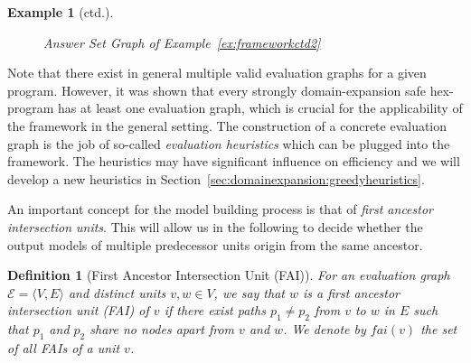 \documentclass[11pt,fleqn,twoside]{article}
\newcommand\hex{{\sc hex}\xspace}
\newtheorem{definition}{Definition}
\newtheorem{example}{Example}
\begin{document}
{\begin{example}[ctd.]
\begin{figure}[h]
					\endpgfgraphicnamed
					
					\caption{Answer Set Graph of Example~\ref{ex:frameworkctd2}}
					\label{fig:ex:frameworkctd:modelgraph}
				\end{figure}
			\end{example}
			
			Note that there exist in general multiple valid evaluation graphs for a given program.
			However, it was shown that every strongly domain-expansion safe \hex-program
			has at least one evaluation graph, which is crucial for the applicability of the framework in the general setting.
			The construction of a concrete evaluation graph is the job of so-called \emph{evaluation heuristics}
			which can be plugged into the framework. The heuristics may have significant influence on efficiency
			and we will develop a new heuristics in Section~\ref{sec:domainexpansion:greedyheuristics}.

			An important concept for the model building process is that of \emph{first ancestor intersection units}.
			This will allow us in the following to decide whether the output models of multiple predecessor units
			origin from the same ancestor.
			
			\begin{definition}[First Ancestor Intersection Unit (FAI)]
				\label{def:fai}
				For an evaluation graph $\mathcal{E} = \langle V, E \rangle$ and distinct units $v, w \in V$,
				we say that $w$ \emph{is a first ancestor intersection unit (FAI) of} $v$ if there exist paths $p_1 \not= p_2$
				from $v$ to $w$ in $E$ such that $p_1$ and $p_2$ share no nodes apart from $v$ and $w$. We denote by $\mathit{fai}(v)$
				the set of all FAIs of a unit $v$.
			\end{definition}
			
}
\end{document}
